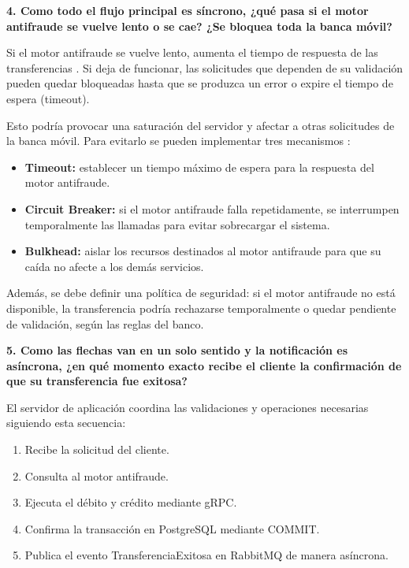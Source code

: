 \documentclass[12pt, a4paper]{article}
\begin{document}
\vspace{0.4cm}

\textbf{4. Como todo el flujo principal es síncrono, ¿qué pasa si el motor antifraude se vuelve lento o se cae? ¿Se bloquea toda la banca móvil?}

Si el motor antifraude se vuelve lento, aumenta el tiempo de respuesta de las transferencias \cite{blinowski2022}. Si deja de funcionar, las solicitudes que dependen de su validación pueden quedar bloqueadas hasta que se produzca un error o expire el tiempo de espera (timeout).

Esto podría provocar una saturación del servidor y afectar a otras solicitudes de la banca móvil. Para evitarlo se pueden implementar tres mecanismos \cite{newman2021}:

\begin{itemize}[leftmargin=1.5cm]
    \item \textbf{Timeout:} establecer un tiempo máximo de espera para la respuesta del motor antifraude.
    \item \textbf{Circuit Breaker:} si el motor antifraude falla repetidamente, se interrumpen temporalmente las llamadas para evitar sobrecargar el sistema.
    \item \textbf{Bulkhead:} aislar los recursos destinados al motor antifraude para que su caída no afecte a los demás servicios.
\end{itemize}

Además, se debe definir una política de seguridad: si el motor antifraude no está disponible, la transferencia podría rechazarse temporalmente o quedar pendiente de validación, según las reglas del banco.

\vspace{0.4cm}

\textbf{5. Como las flechas van en un solo sentido y la notificación es asíncrona, ¿en qué momento exacto recibe el cliente la confirmación de que su transferencia fue exitosa?}

El servidor de aplicación coordina las validaciones y operaciones necesarias siguiendo esta secuencia:

\begin{enumerate}[leftmargin=1.5cm]
    \item Recibe la solicitud del cliente.
    \item Consulta al motor antifraude.
    \item Ejecuta el débito y crédito mediante gRPC.
    \item Confirma la transacción en PostgreSQL mediante COMMIT.
    \item Publica el evento TransferenciaExitosa en RabbitMQ de manera asíncrona.
\end{enumerate}
\end{document}
